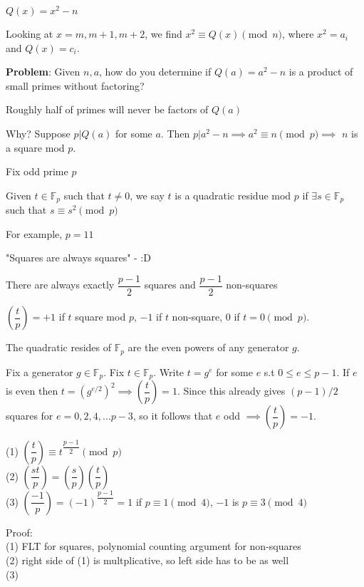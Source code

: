 \documentclass[twoside, 10pt]{article}
\newcommand{\F}{\mathbb{F}}
\begin{document}
$Q(x) = x^2 - n$

Looking at $x = m, m+1, m+2$, we find $x^2 \equiv Q(x) \pmod{n}$, where $x^2 = a_i$ and $Q(x) = c_i$.

\textbf{Problem}: Given $n, a$, how do you determine if $Q(a) = a^2 - n$ is a product of small primes without factoring?


\begin{rmk}
    Roughly half of primes will never be factors of $Q(a)$
\end{rmk}
Why? Suppose $p | Q(a)$ for some $a$. Then $p | a^2 - n \implies a^2 \equiv n \pmod{p} \implies$ $n$ is a square mod $p$.

Fix odd prime $p$

\begin{defn}
    Given $t\in \F_p$ such that $t\neq 0$, we say $t$ is a quadratic residue mod $p$ if $\exists s \in \F_p$ such that $s\equiv s^2 \pmod{p}$
\end{defn}
For example, $p=11$

"Squares are always squares" - :D

There are always exactly $\dfrac{p-1}{2}$ squares and $\dfrac{p-1}{2}$ non-squares 

\begin{defn}
    $\left(\dfrac{t}{p}\right) = +1$ if $t$ square mod $p$, $-1$ if $t$ non-square, $0$ if $t = 0 \pmod{p}$.
\end{defn}

\begin{rmk}
    The quadratic resides of $\F_p$ are the even powers of any generator $g$.
\end{rmk}
Fix a generator $g\in \F_p$. Fix $t\in \F_p$. Write $t = g^e$ for some $e$ s.t $0\leq e \leq p-1$. If $e$ is even then $t = (g^{e/2})^2 \implies \left(\dfrac{t}{p}\right) = 1$. Since this already gives $(p-1)/2$ squares for $e = 0, 2, 4, \ldots p-3$, so it follows that $e$ odd $\implies \left(\dfrac{t}{p}\right) = -1$.

\begin{defn}
    (1) $\left(\dfrac{t}{p}\right) \equiv t^{\dfrac{p-1}{2}} \pmod{p}$\\
    (2) $\left(\dfrac{st}{p}\right) = \left(\dfrac{s}{p}\right)\left(\dfrac{t}{p}\right)$\\
    (3) $\left(\dfrac{-1}{p}\right) = (-1)^{\dfrac{p-1}{2}} = 1$ if $p\equiv 1\pmod{4}$, $-1$ is $p\equiv 3\pmod{4}$
\end{defn}
Proof:\\ 
(1) FLT for squares, polynomial counting argument for non-squares\\
(2) right side of (1) is multplicative, so left side has to be as well\\
(3) 
\end{document}
